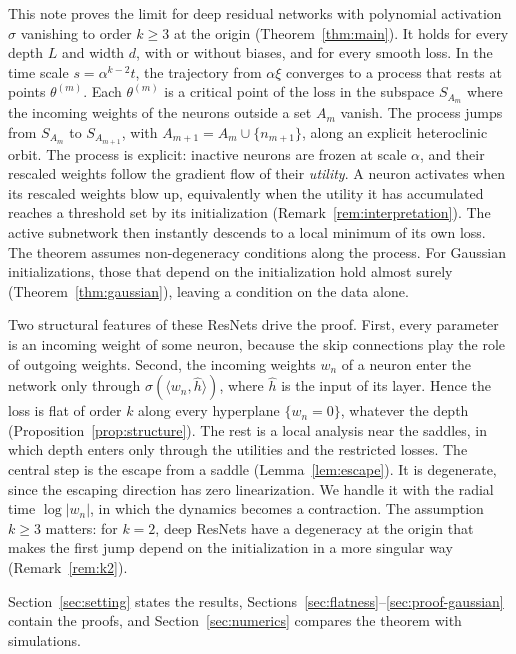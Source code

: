 \documentclass[11pt]{article}
\theoremstyle{definition}
\theoremstyle{remark}
\numberwithin{equation}{section}
\newcommand{\ip}[2]{\langle #1,#2\rangle}
\begin{document}
This note proves the limit for deep residual networks with polynomial activation $\sigma$ vanishing to order $k\ge3$ at the origin (Theorem~\ref{thm:main}). It holds for every depth $L$ and width $d$, with or without biases, and for every smooth loss. In the time scale $s=\alpha^{k-2}t$, the trajectory from $\alpha\xi$ converges to a process that rests at points $\theta^{(m)}$. Each $\theta^{(m)}$ is a critical point of the loss in the subspace $S_{A_m}$ where the incoming weights of the neurons outside a set $A_m$ vanish. The process jumps from $S_{A_m}$ to $S_{A_{m+1}}$, with $A_{m+1}=A_m\cup\{n_{m+1}\}$, along an explicit heteroclinic orbit. The process is explicit: inactive neurons are frozen at scale $\alpha$, and their rescaled weights follow the gradient flow of their \emph{utility}. A neuron activates when its rescaled weights blow up, equivalently when the utility it has accumulated reaches a threshold set by its initialization (Remark~\ref{rem:interpretation}). The active subnetwork then instantly descends to a local minimum of its own loss. The theorem assumes non-degeneracy conditions along the process. For Gaussian initializations, those that depend on the initialization hold almost surely (Theorem~\ref{thm:gaussian}), leaving a condition on the data alone.

Two structural features of these ResNets drive the proof. First, every parameter is an incoming weight of some neuron, because the skip connections play the role of outgoing weights. Second, the incoming weights $w_n$ of a neuron enter the network only through $\sigma(\ip{w_n}{\hat h})$, where $\hat h$ is the input of its layer. Hence the loss is flat of order $k$ along every hyperplane $\{w_n=0\}$, whatever the depth (Proposition~\ref{prop:structure}). The rest is a local analysis near the saddles, in which depth enters only through the utilities and the restricted losses. The central step is the escape from a saddle (Lemma~\ref{lem:escape}). It is degenerate, since the escaping direction has zero linearization. We handle it with the radial time $\log|w_n|$, in which the dynamics becomes a contraction. The assumption $k\ge3$ matters: for $k=2$, deep ResNets have a degeneracy at the origin that makes the first jump depend on the initialization in a more singular way (Remark~\ref{rem:k2}).

Section~\ref{sec:setting} states the results, Sections~\ref{sec:flatness}--\ref{sec:proof-gaussian} contain the proofs, and Section~\ref{sec:numerics} compares the theorem with simulations.
\end{document}

